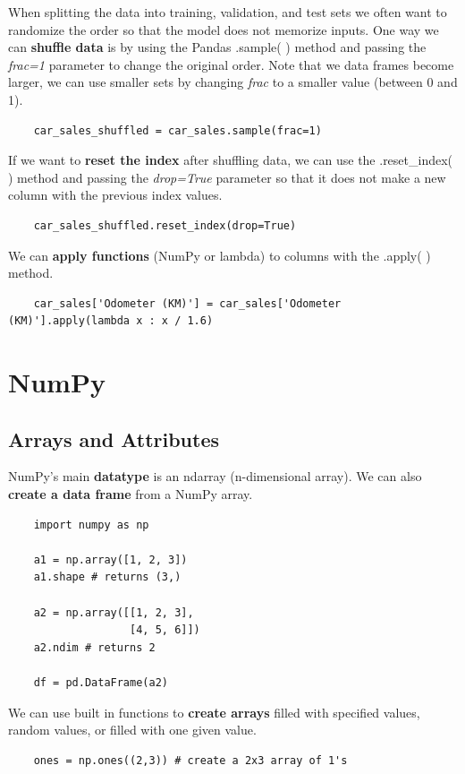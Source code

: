 \documentclass[11pt, a4paper]{article}
\begin{document}
\begin{spacing}{1.1}
	\noindent When splitting the data into training, validation, and test sets we often want to randomize the order so that the model does not memorize inputs. One way we can \textbf{shuffle data} is by using the Pandas .sample( ) method and passing the \textit{frac=1} parameter to change the original order. Note that we data frames become larger, we can use smaller sets by changing \textit{frac} to a smaller value (between 0 and 1).  
	\begin{lstlisting}
	car_sales_shuffled = car_sales.sample(frac=1) \end{lstlisting} \vspace*{1mm} 
	If we want to \textbf{reset the index} after shuffling data, we can use the .reset\_index( ) method and passing the \textit{drop=True} parameter so that it does not make a new column with the previous index values. 
	\begin{lstlisting}
	car_sales_shuffled.reset_index(drop=True) \end{lstlisting} \vspace*{1mm} 
	We can \textbf{apply functions} (NumPy or lambda) to columns with the .apply( ) method. 
	\begin{lstlisting}
	car_sales['Odometer (KM)'] = car_sales['Odometer (KM)'].apply(lambda x : x / 1.6) \end{lstlisting} \vspace*{2mm}
	
	\section{NumPy}
	\subsection{Arrays and Attributes}
	NumPy's main \textbf{datatype} is an ndarray (n-dimensional array). We can also\textbf{ create a data frame} from a NumPy array.
	\begin{lstlisting}
	import numpy as np
	
	a1 = np.array([1, 2, 3])
	a1.shape # returns (3,) 
	
	a2 = np.array([[1, 2, 3],
	               [4, 5, 6]])
	a2.ndim # returns 2 
	
	df = pd.DataFrame(a2) \end{lstlisting} \vspace*{1mm} 	
	We can use built in functions to \textbf{create arrays} filled with specified values, random values, or filled with one given value.
	\begin{lstlisting}
	ones = np.ones((2,3)) # create a 2x3 array of 1's
	

\end{lstlisting}
\end{spacing}
\end{document}
